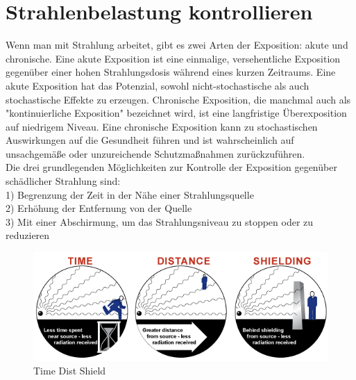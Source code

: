 \section{Strahlenbelastung kontrollieren}
\label{sec:Strahlenbelastung }
Wenn man mit Strahlung arbeitet, gibt es zwei Arten der Exposition: akute und chronische. Eine akute Exposition ist eine einmalige, versehentliche Exposition gegenüber einer hohen Strahlungsdosis während eines kurzen Zeitraums. Eine akute Exposition hat das Potenzial, sowohl nicht-stochastische als auch stochastische Effekte zu erzeugen. Chronische Exposition, die manchmal auch als "kontinuierliche Exposition" bezeichnet wird, ist eine langfristige Überexposition auf niedrigem Niveau. Eine chronische Exposition kann zu stochastischen Auswirkungen auf die Gesundheit führen und ist wahrscheinlich auf unsachgemäße oder unzureichende Schutzmaßnahmen zurückzuführen.\\
Die drei grundlegenden Möglichkeiten zur Kontrolle der Exposition gegenüber schädlicher Strahlung sind:\\
1) Begrenzung der Zeit in der Nähe einer Strahlungsquelle\\
2) Erhöhung der Entfernung von der Quelle\\
3) Mit einer Abschirmung, um das Strahlungsniveau zu stoppen oder zu reduzieren\\
\begin{figure}[htb]
  \centering  
  \includegraphics[scale=0.5]{img/TimeDistShield.png}
  \caption{Time Dist Shield}
  \label{fig:TimeDistShield}
\end{figure}
